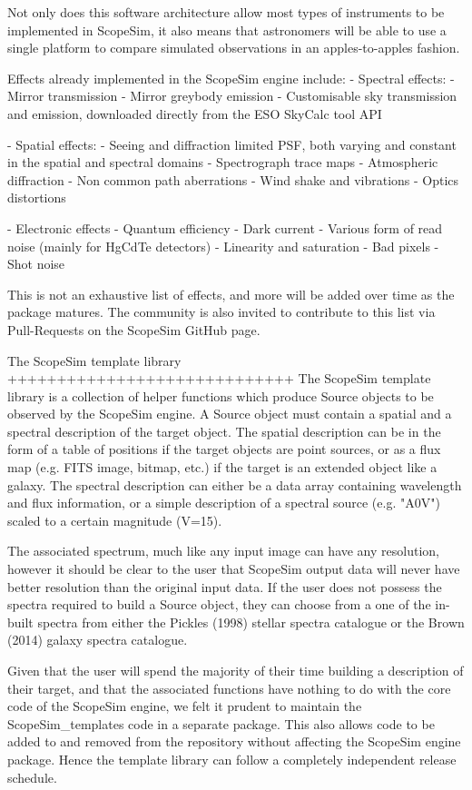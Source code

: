 Not only does this software architecture allow most types of instruments to be
implemented in ScopeSim, it also means that astronomers will be able to use a
single platform to compare simulated observations in an apples-to-apples
fashion.

Effects already implemented in the ScopeSim engine include:
- Spectral effects:
    - Mirror transmission
    - Mirror greybody emission
    - Customisable sky transmission and emission, downloaded directly from the
      ESO SkyCalc tool API

- Spatial effects:
    - Seeing and diffraction limited PSF, both varying and constant in the
      spatial and spectral domains
    - Spectrograph trace maps
    - Atmospheric diffraction
    - Non common path aberrations
    - Wind shake and vibrations
    - Optics distortions

- Electronic effects
    - Quantum efficiency
    - Dark current
    - Various form of read noise (mainly for HgCdTe detectors)
    - Linearity and saturation
    - Bad pixels
    - Shot noise

This is not an exhaustive list of effects, and more will be added over time as
the package matures. The community is also invited to contribute to this list
via Pull-Requests on the ScopeSim GitHub page.


The ScopeSim template library
+++++++++++++++++++++++++++++
The ScopeSim template library is a collection of helper functions which produce
Source objects to be observed by the ScopeSim engine. A Source object must
contain a spatial and a spectral description of the target object. The spatial
description can be in the form of a table of positions if the target objects are
point sources, or as a flux map (e.g. FITS image, bitmap, etc.) if the
target is an extended object like a galaxy. The spectral description can either
be a data array containing wavelength and flux information, or a simple
description of a spectral source (e.g. "A0V") scaled to a certain magnitude
(V=15).

The associated spectrum, much like any input image can have any resolution,
however it should be clear to the user that ScopeSim output data will never
have better resolution than the original input data. If the user does not
possess the spectra required to build a Source object, they can choose from a
one of the in-built spectra from either the Pickles (1998) stellar spectra
catalogue or the Brown (2014) galaxy spectra catalogue.

Given that the user will spend the majority of their time building a description
of their target, and that the associated functions have nothing to do with the
core code of the ScopeSim engine, we felt it prudent to maintain the
ScopeSim_templates code in a separate package. This also allows code to be added
to and removed from the repository without affecting the ScopeSim engine
package. Hence the template library can follow a completely independent release
schedule.


